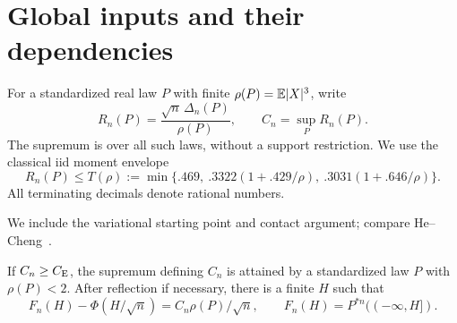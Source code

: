 \section{Global inputs and their dependencies}\label{gi:section}

For a standardized real law $P$ with finite $\rho(P)=\mathbb E|X|^3$, write
\[
 R_n(P)=\frac{\sqrt n\,\Delta_n(P)}{\rho(P)},\qquad
 C_n=\sup_P R_n(P).
\]
The supremum is over all such laws, without a support restriction.
We use the classical iid moment envelope \cite{Shevtsova2013}
\begin{equation}\label{gi:moment-envelope}
 R_n(P)\le T(\rho):=
 \min\{.469,\ .3322(1+.429/\rho),\ .3031(1+.646/\rho)\}.
\end{equation}
All terminating decimals denote rational numbers.

We include the variational starting point and contact argument;
compare He--Cheng~\cite[Lemmas~6.1 and~6.3, equations~(12)--(15)]{HeCheng2026}.
\begin{lemma}\label{gi:extremizer}
If $C_n\ge C_{\mathrm E}$, the supremum defining $C_n$ is attained by a
standardized law $P$ with $\rho(P)<2$. After reflection if necessary,
there is a finite $H$ such that
\[
 F_n(H)-\Phi(H/\sqrt n)=C_n\rho(P)/\sqrt n,
 \qquad F_n(H)=P^{*n}(( -\infty,H]).
\]
\end{lemma}
